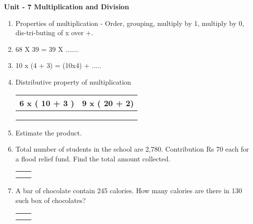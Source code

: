\centerline{\textbf{ \LARGE  Unit - 7 \quad Multiplication and Division }}

\begin{enumerate}

    \item Properties of multiplication - Order, grouping, multiply by 1, multiply by 0,
         dis-tri-buting of x over +.

    \item 68  X  39 = 39  X  .......

    \item 10 x (4 + 3) = (10x4) + .....\item Distributive property of multiplication

    \begin{myTableStyle} \begin{tabular}{ |m{4cm}|m{4cm}| } \hline
        6 x ( 10 + 3 ) & 9 x ( 20 + 2) \\\hline
        & \\\hline
        & \\\hline
        & \\\hline
    \end{tabular} \end{myTableStyle} \vspace{0.08in}

    \item Estimate the product.

    \item Total number of students in the school are 2,780. Contribution Rs 70 each
          for a flood relief fund. Find the total amount collected.

    \begin{myTableStyle} \begin{tabular}{ |m{10cm}|m{3cm}| } \hline
        &  \\\hline
        &  \\\hline
        \multicolumn{2}{|c|}{} \\\hline
    \end{tabular} \end{myTableStyle} \vspace{0.08in}

    \item A bar of chocolate contain 245 calories. How many calories are there in 130 such box of chocolates?

    \begin{myTableStyle} \begin{tabular}{ |m{10cm}|m{3cm}| } \hline
        &  \\\hline
        &  \\\hline
        \multicolumn{2}{|c|}{} \\\hline
    \end{tabular} \end{myTableStyle} \vspace{0.08in}


\end{enumerate}
